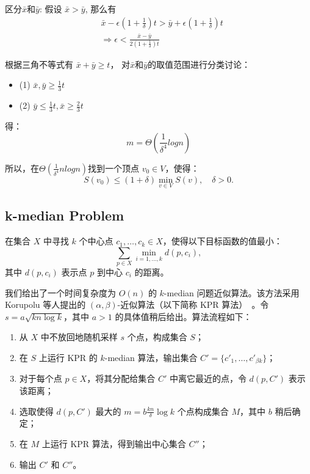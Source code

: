 \documentclass[lang=cn,newtx,10pt,scheme=chinese,chinesefont=nofont,citestyle=gb7714-2015, bibstyle=gb7714-2015]{elegantbook}
\begin{document}
\begin{refsection}
区分$\bar{x}$和$\bar{y}$: 假设 $\bar{x} > \bar{y}$, 那么有
\begin{align*}
    & \bar{x} - \epsilon (1+\frac{1}{\delta})t > \bar{y} + \epsilon (1+\frac{1}{\delta})t \\
    &\Rightarrow \epsilon < \frac{\bar{x}-\bar{y}}{2(1+\frac{1}{\delta})t}
\end{align*}

根据三角不等式有 $\bar{x} + \bar{y} \geq t$， 对$\bar{x}$和$\bar{y}$的取值范围进行分类讨论：\begin{itemize}
    \item (1) $\bar{x}, \bar{y} \geq \frac{1}{3}t$
    \item (2) $\bar{y} \leq \frac{1}{3}t, \bar{x}\geq \frac{2}{3}t$
\end{itemize}

得：
\begin{equation*}
    m = \Theta (\frac{1}{\delta^4}log n)
\end{equation*}

所以，在$\Theta (\frac{1}{\delta^4} n log n)$找到一个顶点 \( v_0 \in V \)，使得：
\[
S(v_0) \leq (1+\delta) \min\limits_{v \in V} S(v), \quad \delta > 0.
\]

\subsection{k-median Problem}
\begin{definition}[k-median]
在集合 $X$ 中寻找 $k$ 个中心点 $c_1, \dots, c_k \in X$，使得以下目标函数的值最小：
\[
\sum_{p \in X} \min_{i = 1, \dots, k} d(p, c_i),
\]
其中 $d(p, c_i)$ 表示点 $p$ 到中心 $c_i$ 的距离。
\end{definition}

我们给出了一个时间复杂度为 $O(n)$ 的 $k$-median 问题近似算法。该方法采用 Korupolu 等人提出的 $(\alpha, \beta)$-近似算法（以下简称 KPR 算法）~\cite{korupolu2000analysis}。令 $s = a\sqrt{kn \log k}$，其中 $a > 1$ 的具体值稍后给出。算法流程如下：

\begin{enumerate}
    \item 从 $X$ 中不放回地随机采样 $s$ 个点，构成集合 $S$；
    \item 在 $S$ 上运行 KPR 的 $k$-median 算法，输出集合 $C' = \{c'_1, \dots, c'_{\beta k}\}$；
    \item 对于每个点 $p \in X$，将其分配给集合 $C'$ 中离它最近的点，令 $d(p, C')$ 表示该距离；
    \item 选取使得 $d(p, C')$ 最大的 $m = b \frac{kn}{\delta} \log k$ 个点构成集合 $M$，其中 $b$ 稍后确定；
    \item 在 $M$ 上运行 KPR 算法，得到输出中心集合 $C''$；
    \item 输出 $C'$ 和 $C''$。
\end{enumerate}


\end{refsection}
\end{document}
